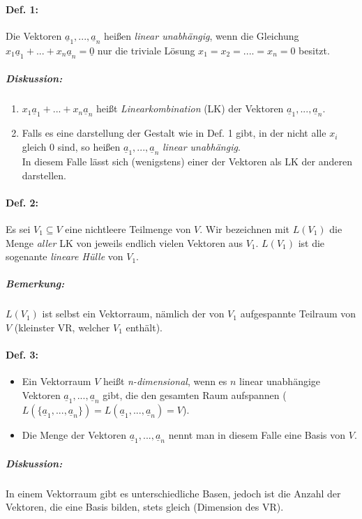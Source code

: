 \paragraph{Def. 1:} \parskp
Die Vektoren $\underline{a}_1, ..., \underline{a}_n$ heißen \emph{linear unabhängig}, wenn die Gleichung $\boxed{x_1\underline{a}_1+...+x_n\underline{a}_n=\underline{0}}$ nur die triviale Lösung $x_1=x_2 = .... =x_n = 0$ besitzt.
\subparagraph{Diskussion:}
\begin{enumerate}
\item $x_1\underline{a}_1+...+x_n\underline{a}_n$ heißt \emph{Linearkombination} (LK) der Vektoren $\underline{a}_1, ..., \underline{a}_n$.
\item Falls es eine darstellung der Gestalt wie in Def. 1 gibt, in der nicht alle $x_i$ gleich 0 sind, so heißen $\underline{a}_1, ..., \underline{a}_n$ \emph{linear unabhängig}.\\
In diesem Falle lässt sich (wenigstens) einer der Vektoren als LK der anderen darstellen.
\end{enumerate}

\paragraph{Def. 2:} \parskp
Es sei $V_1 \subseteq V$ eine nichtleere Teilmenge von $V$. Wir bezeichnen mit $L(V_1)$ die Menge \emph{aller} LK von jeweils endlich vielen Vektoren aus $V_1$. $L(V_1)$ ist die sogenante \emph{lineare Hülle} von $V_1$.
\subparagraph{Bemerkung:} \parskp
$L(V_1)$ ist selbst ein Vektorraum, nämlich der von $V_1$ aufgespannte Teilraum von $V$ (kleinster VR, welcher $V_1$ enthält).

\paragraph{Def. 3:}
\begin{itemize}
\item Ein Vektorraum $V$ heißt \emph{n-dimensional}, wenn es $n$ linear unabhängige Vektoren $\underline{a}_1, ..., \underline{a}_n$ gibt, die den gesamten Raum aufspannen ($L(\{\underline{a}_1, ..., \underline{a}_n\})=L(\underline{a}_1, ..., \underline{a}_n)=V$).
\item Die Menge der Vektoren $\underline{a}_1, ..., \underline{a}_n$ nennt man in diesem Falle eine Basis von $V$.
\end{itemize}
\subparagraph{Diskussion:}\parskp
In einem Vektorraum gibt es unterschiedliche Basen, jedoch ist die Anzahl der Vektoren, die eine Basis bilden, stets gleich (Dimension des VR).
